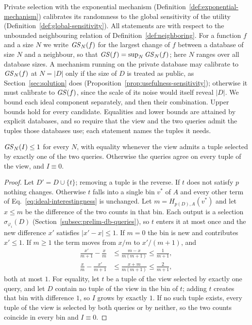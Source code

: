 Private selection with the exponential mechanism (Definition~\ref{def:exponential-mechanism}) calibrates its randomness to the global sensitivity of the utility (Definition~\ref{def:global-sensitivity}).
All statements are with respect to the unbounded neighbouring relation of Definition~\ref{def:neighboring}.
For a function $f$ and a size $N$ we write $\mathit{GS}_N(f)$ for the largest change of $f$ between a database of size $N$ and a neighbour, so that $\mathit{GS}(f)=\sup_N\mathit{GS}_N(f)$; here $N$ ranges over all database sizes.
A mechanism running on the private database may calibrate to $\mathit{GS}_N(f)$ at $N=|D|$ only if the size of $D$ is treated as public, as Section~\ref{sec:solution} does (Proposition~\ref{prop:usefulness-sensitivity}); otherwise it must calibrate to $\mathit{GS}(f)$, since the scale of its noise would itself reveal $|D|$.
We bound each ideal component separately, and then their combination.
Upper bounds hold for every candidate.
Equalities and lower bounds are attained by explicit databases, and so require that the view and the two queries admit the tuples those databases use; each statement names the tuples it needs.

\begin{lemma}[Interestingness]
\label{lem:ideal-interestingness}
$\mathit{GS}_N(I)\le1$ for every $N$, with equality whenever the view admits a tuple selected by exactly one of the two queries.
Otherwise the queries agree on every tuple of the view, and $I\equiv0$.
\end{lemma}

\begin{proof}
Let $D'=D\cup\{t\}$; removing a tuple is the reverse.
If $t$ does not satisfy $p$ nothing changes.
Otherwise $t$ falls into a single bin $v^*$ of $A$ and every other term of Eq.~\eqref{eq:ideal-interestingness} is unchanged.
Let $m=H_{p(D),A}(v^*)$ and let $x\le m$ be the difference of the two counts in that bin.
Each output is a selection $\sigma_{\varphi_i}(D)$ (Section~\ref{subsec:prelim-db-queries}), so $t$ enters it at most once and the new difference $x'$ satisfies $|x'-x|\le1$.
If $m=0$ the bin is new and contributes $x'\le1$.
If $m\ge1$ the term moves from $x/m$ to $x'/(m+1)$, and
\begin{align*}
\frac{x'}{m+1}-\frac{x}{m}&\le\frac{m-x}{m(m+1)}\le\frac1{m+1},\\
\frac{x}{m}-\frac{x'}{m+1}&\le\frac{x+m}{m(m+1)}\le\frac2{m+1},
\end{align*}
both at most $1$.
For equality, let $t$ be a tuple of the view selected by exactly one query, and let $D$ contain no tuple of the view in the bin of $t$; adding $t$ creates that bin with difference $1$, so $I$ grows by exactly $1$.
If no such tuple exists, every tuple of the view is selected by both queries or by neither, so the two counts coincide in every bin and $I\equiv0$.
\end{proof}

